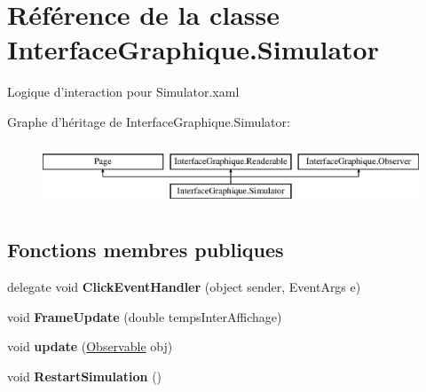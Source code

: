 \hypertarget{class_interface_graphique_1_1_simulator}{\section{Référence de la classe Interface\-Graphique.\-Simulator}
\label{class_interface_graphique_1_1_simulator}
}


Logique d'interaction pour Simulator.\-xaml  


Graphe d'héritage de Interface\-Graphique.\-Simulator\-:\begin{figure}[H]
\begin{center}
\leavevmode
\includegraphics[height=1.895093cm]{class_interface_graphique_1_1_simulator}
\end{center}
\end{figure}
\subsection*{Fonctions membres publiques}
\begin{DoxyCompactItemize}
\item 
\hypertarget{class_interface_graphique_1_1_simulator_ae8b1f200692134144bc420c95eea9b03}{delegate void {\bfseries Click\-Event\-Handler} (object sender, Event\-Args e)}\label{class_interface_graphique_1_1_simulator_ae8b1f200692134144bc420c95eea9b03}

\item 
\hypertarget{class_interface_graphique_1_1_simulator_a00a633b482ada4aa037e72d9b860f0a1}{void {\bfseries Frame\-Update} (double temps\-Inter\-Affichage)}\label{class_interface_graphique_1_1_simulator_a00a633b482ada4aa037e72d9b860f0a1}

\item 
\hypertarget{class_interface_graphique_1_1_simulator_ac4645b6fb396c5f0c06b286e56ec0198}{void {\bfseries update} (\hyperlink{interface_interface_graphique_1_1_observable}{Observable} obj)}\label{class_interface_graphique_1_1_simulator_ac4645b6fb396c5f0c06b286e56ec0198}

\item 
\hypertarget{class_interface_graphique_1_1_simulator_a098c4852546c41fa59c43204e2bcc0ec}{void {\bfseries Restart\-Simulation} ()}\label{class_interface_graphique_1_1_simulator_a098c4852546c41fa59c43204e2bcc0ec}

\end{DoxyCompactItemize}
